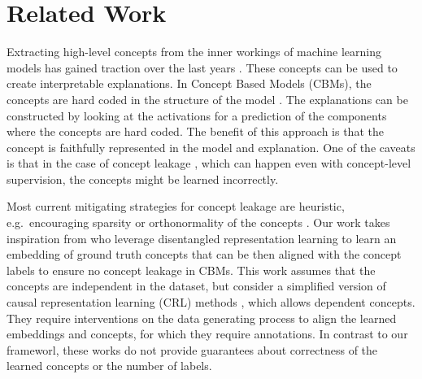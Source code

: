 \section{Related Work}
Extracting high-level concepts from the inner workings of machine learning
models has gained traction over the last years \citep{alain2017understanding,
ghorbani2019towards, mcgrath2021acquisition}. These concepts can be used to
create interpretable explanations. In Concept Based Models (CBMs), the concepts
are hard coded in the structure of the model \citep{koh2020conceptbottleneck,
marconato2022glance, ismail2023concept, zarlenga2022concept}. The explanations
can be constructed by looking at the activations for a prediction of the
components where the concepts are hard coded. The benefit of this approach is
that the concept is faithfully represented in the model and explanation. One of
the caveats is that in the case of concept leakage
\cite{margeloiu2021conceptbottleneckmodelslearn,mahinpei2021promisespitfallsblackboxconcept},
which can happen even with concept-level supervision, the concepts might be
learned incorrectly. 

Most current mitigating strategies for concept leakage are heuristic, e.g.\
encouraging sparsity \cite{10.5555/3327757.3327875} or orthonormality of the
concepts \cite{orthonormal-concepts}. Our work takes inspiration from
\cite{marconato2022glance} who leverage disentangled representation learning to
learn an embedding of ground truth concepts that can be then aligned with the
concept labels to ensure no concept leakage in CBMs. This work assumes that the
concepts are  independent in the dataset, but
\citet{marconato2023humanintepretable} consider a simplified version of causal
representation learning (CRL) methods \cite{scholkopf2021crl}, which allows
dependent concepts. They require interventions on the data generating process
to align the learned embeddings and concepts, for which they require
annotations. In contrast to our frameworl, these works do not provide
guarantees about correctness of the learned concepts or the number of labels. 

